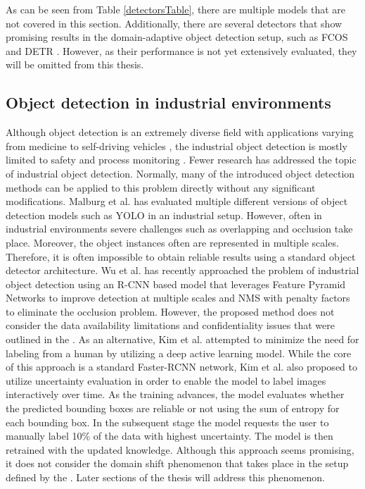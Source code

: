As can be seen from Table \ref{detectorsTable}, there are multiple models that are not covered in this section. Additionally, there are several detectors that show promising results in the domain-adaptive object detection setup, such as FCOS \cite{Tian2019} and DETR \cite{Zhang2021b}. However, as their performance is not yet extensively evaluated, they will be omitted from this thesis. 
\FloatBarrier

\subsection{Object detection in industrial environments}
Although object detection is an extremely diverse field with applications varying from medicine \cite{9689485} to self-driving vehicles \cite{Janai2017, Shan2018}, the industrial object detection is mostly limited to safety and process monitoring \cite{Awalgaonkar2020, Banf2022}. Fewer research has addressed the topic of industrial object detection. Normally, many of the introduced object detection methods can be applied to this problem directly without any significant modifications. Malburg et al. \cite{MALBURG2021581} has evaluated multiple different versions of object detection models such as YOLO \cite{Redmon2015a} in an industrial setup. However, often in industrial environments severe challenges such as overlapping and occlusion take place. Moreover, the object instances often are represented in multiple scales. Therefore, it is often impossible to obtain reliable results using a standard object detector architecture. Wu et al. \cite{Wu2022} has recently approached the problem of industrial object detection using an R-CNN based model that leverages Feature Pyramid Networks to improve detection at multiple scales and NMS with penalty factors to eliminate the  occlusion problem. However, the proposed method does not consider the data availability limitations and confidentiality issues that were outlined in the . As an alternative, Kim et al. \cite{Kim2020} attempted to minimize the need for labeling from a human by utilizing a deep active learning model. While the core of this approach is a standard Faster-RCNN \cite{ima} network, Kim et al. also proposed to utilize uncertainty evaluation in order to enable the model to label images interactively over time. As the training advances, the model evaluates whether the predicted bounding boxes are reliable or not using the sum of entropy for each bounding box. In the subsequent stage the model requests the user to manually label 10\% of the data with highest uncertainty. The model is then retrained with the updated knowledge. Although this approach seems promising, it  does not consider the domain shift phenomenon that takes place in the setup defined by the . Later sections of the thesis will address this phenomenon. 


